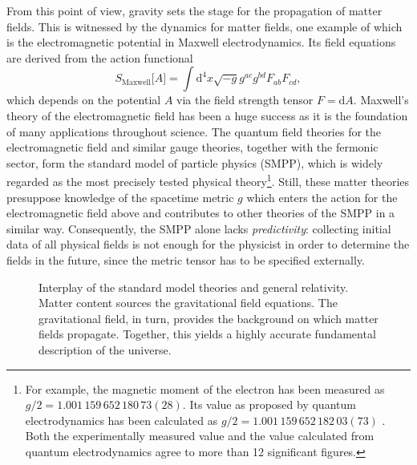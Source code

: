 From this point of view, gravity sets the stage for the propagation of matter fields. This is witnessed by the dynamics for matter fields, one example of which is the electromagnetic potential in Maxwell electrodynamics. Its field equations are derived from the action functional
\begin{equation*}
  S_\text{Maxwell}\lbrack A\rbrack = \int\mathrm d^4x \sqrt{-g} g^{ac} g^{bd} F_{ab} F_{cd},
\end{equation*}
which depends on the potential $A$ via the field strength tensor $F = \mathrm dA$. Maxwell's theory of the electromagnetic field has been a huge success as it is the foundation of many applications throughout science. The quantum field theories for the electromagnetic field and similar gauge theories, together with the fermonic sector, form the standard model of particle physics (SMPP), which is widely regarded as the most precisely tested physical theory\footnote{For example, the magnetic moment of the electron has been measured as $g/2 = 1.001\,159\,652\,180\,73(28)$. \cite{Hanneke_2011} Its value as proposed by quantum electrodynamics has been calculated as $g/2 = 1.001\,159\,652\,182\,03(73)$ \cite{Aoyama_2017}. Both the experimentally measured value and the value calculated from quantum electrodynamics agree to more than 12 significant figures.}. Still, these matter theories presuppose knowledge of the spacetime metric $g$ which enters the action for the electromagnetic field above and contributes to other theories of the SMPP in a similar way. Consequently, the SMPP alone lacks \emph{predictivity}: collecting initial data of all physical fields is not enough for the physicist in order to determine the fields in the future, since the metric tensor has to be specified externally. 

\begin{figure}
  \begin{center}
  \end{center}
  \caption{Interplay of the standard model theories and general relativity. Matter content sources the gravitational field equations. The gravitational field, in turn, provides the background on which matter fields propagate. Together, this yields a highly accurate fundamental description of the universe.}
  \label{figure_smpp_gr}
\end{figure}

